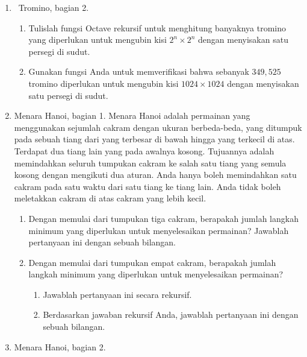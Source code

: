 \begin{enumerate}
\begin{enumerate}
\item Dengan pendekatan rekursif, berapa banyak tromino yang diperlukan
untuk mengubin kisi $2^{n}\times2^{n}$ dengan menyisakan satu persegi
di sudut?
\item \label{tromino-greatest}Berapa nilai bilangan bulat terbesar untuk
$n$ yang tidak tercakup dalam definisi rekursif tersebut?
\item Untuk nilai $n$ pada bagian \ref{tromino-greatest}, berapa banyak
tromino yang diperlukan?
\end{enumerate}
\item \label{exc:recursion-1}\octave\ Tromino, bagian 2. \hasasolution 

\begin{enumerate}
\item Tulislah fungsi Octave rekursif untuk menghitung banyaknya tromino
yang diperlukan untuk mengubin kisi $2^{n}\times2^{n}$ dengan menyisakan
satu persegi di sudut.
\item Gunakan fungsi Anda untuk memverifikasi bahwa sebanyak $349,525$
tromino diperlukan untuk mengubin kisi $1024\times1024$ dengan menyisakan
satu persegi di sudut.
\end{enumerate}
\item \label{exc:recursion-2}Menara Hanoi, bagian 1. Menara Hanoi adalah
permainan yang menggunakan sejumlah cakram dengan ukuran berbeda-beda,
yang ditumpuk pada sebuah tiang dari yang terbesar di bawah hingga
yang terkecil di atas. Terdapat dua tiang lain yang pada awalnya kosong.
Tujuannya adalah memindahkan seluruh tumpukan cakram ke salah satu
tiang yang semula kosong dengan mengikuti dua aturan. Anda hanya boleh
memindahkan satu cakram pada satu waktu dari satu tiang ke tiang lain.
Anda tidak boleh meletakkan cakram di atas cakram yang lebih kecil. \hasasolution 

\begin{enumerate}
\item Dengan memulai dari tumpukan tiga cakram, berapakah jumlah langkah
minimum yang diperlukan untuk menyelesaikan permainan? Jawablah pertanyaan
ini dengan sebuah bilangan.
\item Dengan memulai dari tumpukan empat cakram, berapakah jumlah langkah
minimum yang diperlukan untuk menyelesaikan permainan?

\begin{enumerate}
\item \label{enu:tower-recursion}Jawablah pertanyaan ini secara rekursif.
\item Berdasarkan jawaban rekursif Anda, jawablah pertanyaan ini dengan
sebuah bilangan.
\end{enumerate}
\end{enumerate}
\item \label{exc:recursion-3}Menara Hanoi, bagian 2. \hasasolution 


\end{enumerate}
